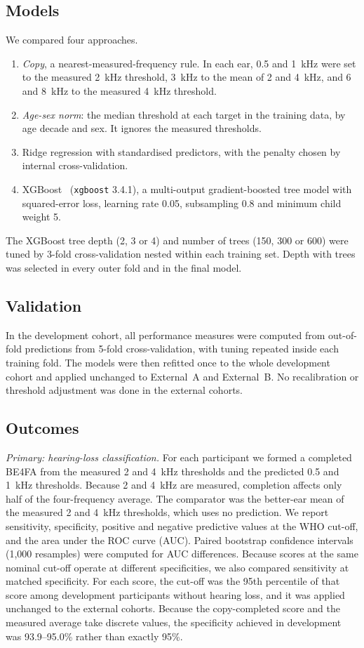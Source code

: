 \documentclass[11pt]{article}
\begin{document}
\subsection*{Models}
We compared four approaches.
\begin{enumerate}
\item \emph{Copy}, a nearest-measured-frequency rule. In each ear, 0.5 and 1~kHz were set to the measured 2~kHz threshold, 3~kHz to the mean of 2 and 4~kHz, and 6 and 8~kHz to the measured 4~kHz threshold.
\item \emph{Age-sex norm}: the median threshold at each target in the training data, by age decade and sex. It ignores the measured thresholds.
\item Ridge regression with standardised predictors, with the penalty chosen by internal cross-validation.
\item XGBoost~\cite{chen2016} (\texttt{xgboost} 3.4.1), a multi-output gradient-boosted tree model with squared-error loss, learning rate 0.05, subsampling 0.8 and minimum child weight 5.
\end{enumerate}
The XGBoost tree depth (2, 3 or 4) and number of trees (150, 300 or 600) were tuned by 3-fold cross-validation nested within each training set. Depth \XgbDepth{} with \XgbTrees{} trees was selected in every outer fold and in the final model.

\subsection*{Validation}
In the development cohort, all performance measures were computed from out-of-fold predictions from 5-fold cross-validation, with tuning repeated inside each training fold. The models were then refitted once to the whole development cohort and applied unchanged to External~A and External~B. No recalibration or threshold adjustment was done in the external cohorts.

\subsection*{Outcomes}
\emph{Primary: hearing-loss classification.} For each participant we formed a completed BE4FA from the measured 2 and 4~kHz thresholds and the predicted 0.5 and 1~kHz thresholds. Because 2 and 4~kHz are measured, completion affects only half of the four-frequency average. The comparator was the better-ear mean of the measured 2 and 4~kHz thresholds, which uses no prediction. We report sensitivity, specificity, positive and negative predictive values at the WHO cut-off, and the area under the ROC curve (AUC). Paired bootstrap confidence intervals (1,000 resamples) were computed for AUC differences. Because scores at the same nominal cut-off operate at different specificities, we also compared sensitivity at matched specificity. For each score, the cut-off was the 95th percentile of that score among development participants without hearing loss, and it was applied unchanged to the external cohorts. Because the copy-completed score and the measured average take discrete values, the specificity achieved in development was 93.9--95.0\% rather than exactly 95\%.
\end{document}
